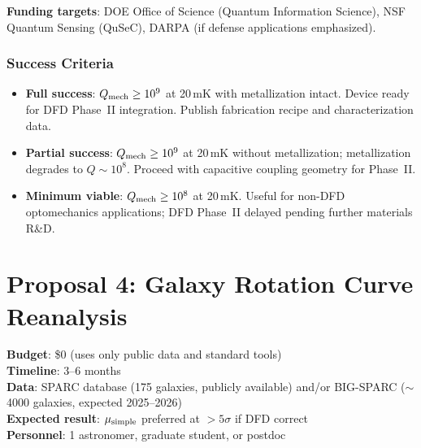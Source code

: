 \documentclass[11pt]{article}
\begin{document}
\textbf{Funding targets}: DOE Office of Science (Quantum Information
Science), NSF Quantum Sensing (QuSeC), DARPA (if defense applications
emphasized).

\section{Success Criteria}

\begin{itemize}
\item \textbf{Full success}: $Q_{\rm mech} \geq 10^9$ at 20\,mK
  with metallization intact. Device ready for DFD Phase~II integration.
  Publish fabrication recipe and characterization data.
\item \textbf{Partial success}: $Q_{\rm mech} \geq 10^9$ at 20\,mK
  without metallization; metallization degrades to $Q \sim 10^8$.
  Proceed with capacitive coupling geometry for Phase~II.
\item \textbf{Minimum viable}: $Q_{\rm mech} \geq 10^8$ at 20\,mK.
  Useful for non-DFD optomechanics applications; DFD Phase~II delayed
  pending further materials R\&D.
\end{itemize}


\newpage
\part{Proposal 4: Galaxy Rotation Curve Reanalysis}
\label{part:sparc}

\begin{tcolorbox}[colback=green!3!white, colframe=actioncolor,
  title=\textbf{PROPOSAL 4 --- GALAXY ROTATION CURVE REANALYSIS}]
\textbf{Budget}: \$0 (uses only public data and standard tools)\\
\textbf{Timeline}: 3--6 months\\
\textbf{Data}: SPARC database (175 galaxies, publicly available)
and/or BIG-SPARC ($\sim$4000 galaxies, expected 2025--2026)\\
\textbf{Expected result}: $\mu_{\rm simple}$ preferred at $>5\sigma$
if DFD correct\\
\textbf{Personnel}: 1 astronomer, graduate student, or postdoc
\end{tcolorbox}
\end{document}
